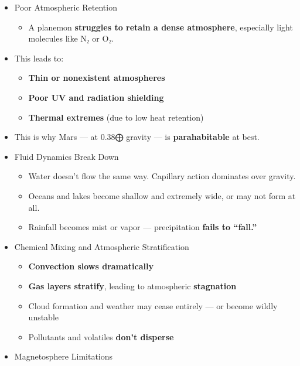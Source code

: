 \documentclass[
  letterpaper,
]{book}
\providecommand{\tightlist}{%
  \setlength{\itemsep}{0pt}\setlength{\parskip}{0pt}}
\begin{document}
\begin{itemize}
\tightlist
\item
  Poor Atmospheric Retention

  \begin{itemize}
  \tightlist
  \item
    A planemon \textbf{struggles to retain a dense atmosphere},
    especially light molecules like N₂ or O₂.\\
  \end{itemize}
\item
  This leads to:

  \begin{itemize}
  \tightlist
  \item
    \textbf{Thin or nonexistent atmospheres}\\
  \item
    \textbf{Poor UV and radiation shielding}\\
  \item
    \textbf{Thermal extremes} (due to low heat retention)
  \end{itemize}
\item
  This is why Mars --- at 0.38⨁ gravity --- is \textbf{parahabitable} at
  best.
\item
  Fluid Dynamics Break Down

  \begin{itemize}
  \tightlist
  \item
    Water doesn't flow the same way. Capillary action dominates over
    gravity.
  \item
    Oceans and lakes become shallow and extremely wide, or may not form
    at all.
  \item
    Rainfall becomes mist or vapor --- precipitation \textbf{fails to
    ``fall.''}
  \end{itemize}
\item
  Chemical Mixing and Atmospheric Stratification

  \begin{itemize}
  \tightlist
  \item
    \textbf{Convection slows dramatically}\\
  \item
    \textbf{Gas layers stratify}, leading to atmospheric
    \textbf{stagnation}\\
  \item
    Cloud formation and weather may cease entirely --- or become wildly
    unstable\\
  \item
    Pollutants and volatiles \textbf{don't disperse}
  \end{itemize}
\item
  Magnetosphere Limitations


\end{itemize}
\end{document}
